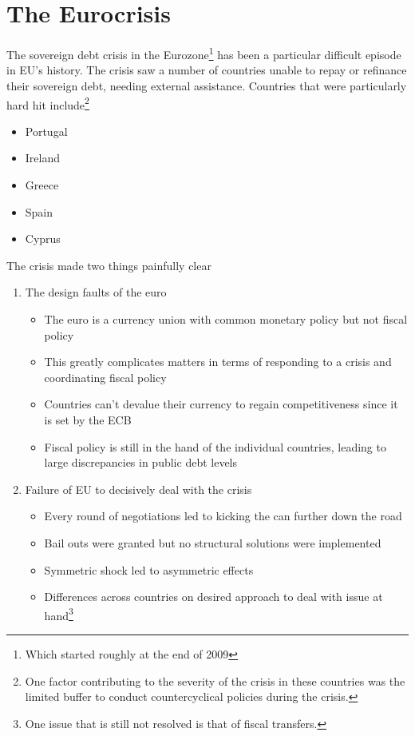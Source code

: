 \documentclass{tufte-handout}
\begin{document}
\section{The Eurocrisis}
The sovereign debt crisis in the Eurozone\footnote{Which started roughly at the end of 2009} has been a particular difficult episode in EU's history. 
The crisis saw a number of countries unable to repay or refinance their sovereign debt, needing external assistance. 
Countries that were particularly hard hit include\footnote{One factor contributing to the severity of the crisis in these countries was the limited buffer to conduct countercyclical policies during the crisis.}
\begin{itemize}
  \item Portugal
  \item Ireland
  \item Greece
  \item Spain
  \item Cyprus
\end{itemize} 


The crisis made two things painfully clear
\begin{enumerate}
  \item The design faults of the euro  
  \begin{itemize}
    \item The euro is a currency union with common monetary policy but not fiscal policy
    \item This greatly complicates matters in terms of responding to a crisis and coordinating fiscal policy
    \item Countries can't devalue their currency to regain competitiveness since it is set by the ECB
    \item Fiscal policy is still in the hand of the individual countries, leading to large discrepancies in public debt levels
  \end{itemize}
  \item Failure of EU to decisively deal with the crisis  
  \begin{itemize}
    \item Every round of negotiations led to kicking the can further down the road
    \item Bail outs were granted but no structural solutions were implemented
    \item Symmetric shock led to asymmetric effects
    \item Differences across countries on desired approach to deal with issue at hand\footnote{One issue that is still not resolved is that of fiscal transfers.}    
  \end{itemize}
\end{enumerate}
\end{document}
